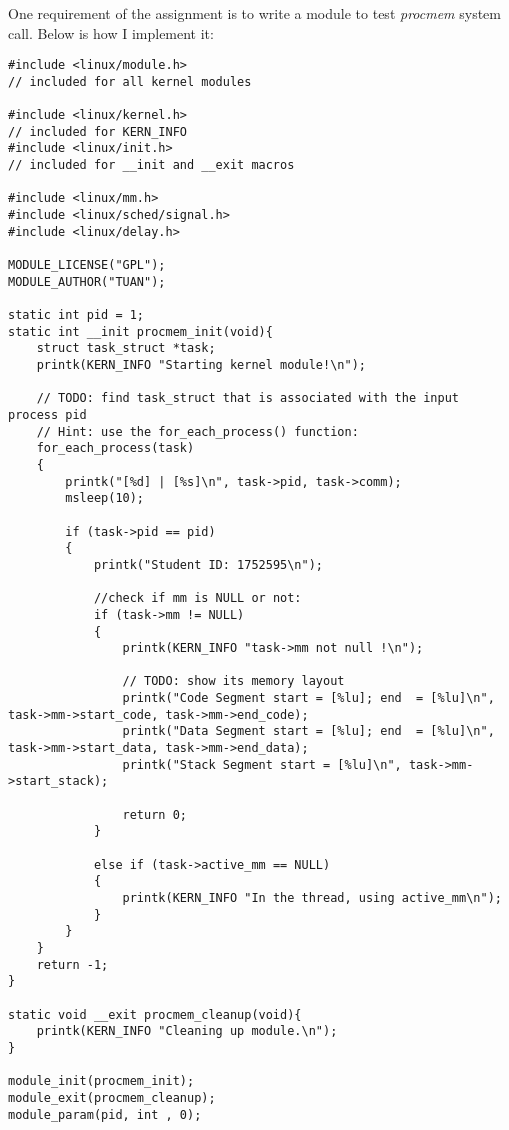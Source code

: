 \documentclass[a4paper, 11pt]{article}
\begin{document}
\par{One requirement of the assignment is to write a module to test \textit{procmem} system call. Below is how I implement it:}
\bigbreak

\begin{verbatim}
#include <linux/module.h> 
// included for all kernel modules

#include <linux/kernel.h> 
// included for KERN_INFO
#include <linux/init.h>
// included for __init and __exit macros

#include <linux/mm.h>
#include <linux/sched/signal.h>
#include <linux/delay.h>

MODULE_LICENSE("GPL");
MODULE_AUTHOR("TUAN");

static int pid = 1;
static int __init procmem_init(void){
    struct task_struct *task;
    printk(KERN_INFO "Starting kernel module!\n");

    // TODO: find task_struct that is associated with the input process pid
    // Hint: use the for_each_process() function:
    for_each_process(task)
    {
        printk("[%d] | [%s]\n", task->pid, task->comm);
        msleep(10);

        if (task->pid == pid)
        {
            printk("Student ID: 1752595\n");

            //check if mm is NULL or not:
            if (task->mm != NULL)
            {
                printk(KERN_INFO "task->mm not null !\n");

                // TODO: show its memory layout
                printk("Code Segment start = [%lu]; end  = [%lu]\n", task->mm->start_code, task->mm->end_code);
                printk("Data Segment start = [%lu]; end  = [%lu]\n", task->mm->start_data, task->mm->end_data);
                printk("Stack Segment start = [%lu]\n", task->mm->start_stack);

                return 0;
            }

            else if (task->active_mm == NULL)
            {
                printk(KERN_INFO "In the thread, using active_mm\n");
            }
        }
    }
    return -1;
}

static void __exit procmem_cleanup(void){
    printk(KERN_INFO "Cleaning up module.\n");
}

module_init(procmem_init);
module_exit(procmem_cleanup);
module_param(pid, int , 0);
    
\end{verbatim}
\end{document}
